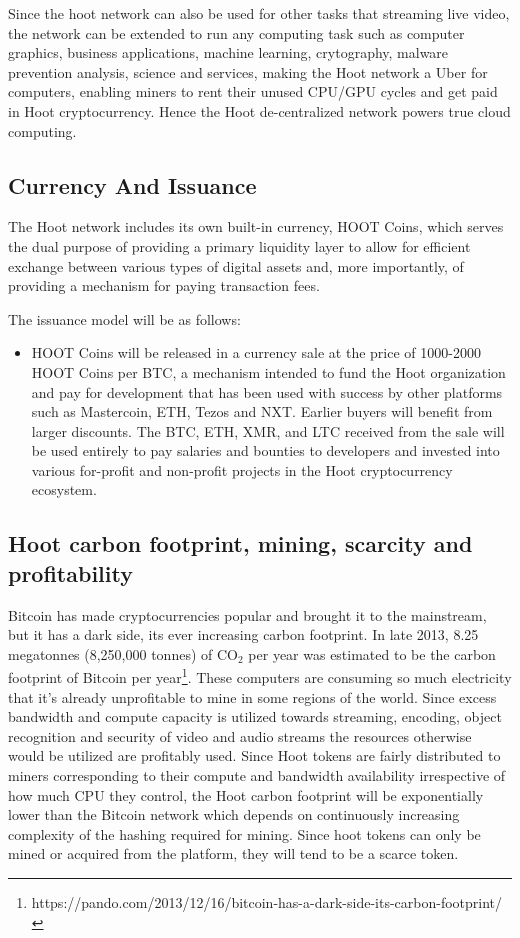\documentclass{article}
\begin{document}
Since the hoot network can also be used for other tasks that streaming live video, the network can be extended to run any computing task such as computer graphics, business applications, machine learning, crytography, malware prevention analysis, science and services, making the Hoot network a Uber for computers, enabling miners to rent their unused CPU/GPU cycles and get paid in Hoot cryptocurrency. Hence the Hoot de-centralized network powers true cloud computing.

\subsection{Currency And Issuance}

The Hoot network includes its own built-in currency, HOOT Coins, which serves the dual purpose of providing a primary liquidity layer to allow for efficient exchange between various types of digital assets and, more importantly, of providing a mechanism for paying transaction fees.

The issuance model will be as follows:

\begin{itemize}

\item HOOT Coins will be released in a currency sale at the price of 1000-2000 HOOT Coins per BTC, a mechanism intended to fund the Hoot organization and pay for development that has been used with success by other platforms such as Mastercoin, ETH, Tezos and NXT. Earlier buyers will benefit from larger discounts. The BTC, ETH, XMR, and LTC received from the sale will be used entirely to pay salaries and bounties to developers and invested into various for-profit and non-profit projects in the Hoot cryptocurrency ecosystem.

\end{itemize}

\subsection{Hoot carbon footprint, mining, scarcity and profitability}
Bitcoin has made cryptocurrencies popular and brought it to the mainstream, but it has a dark side, its ever increasing carbon footprint. In late 2013, 8.25 megatonnes (8,250,000 tonnes) of CO$_2$ per year
was estimated to be the carbon footprint of Bitcoin per year\footnote{https://pando.com/2013/12/16/bitcoin-has-a-dark-side-its-carbon-footprint/}. These
computers are consuming so much electricity that it’s already
unprofitable to mine in some regions of the world. Since excess
bandwidth and compute capacity is utilized towards streaming,
encoding, object recognition
and security of video and audio streams the resources otherwise would
be utilized are profitably used.  Since Hoot tokens are fairly distributed to miners corresponding to their compute and bandwidth availability irrespective of how much CPU they control, the Hoot carbon footprint will be exponentially lower than the Bitcoin network which depends on continuously increasing complexity of the hashing required for mining. Since hoot tokens can only be mined or acquired from the platform, they will tend to be a scarce token.
\end{document}
